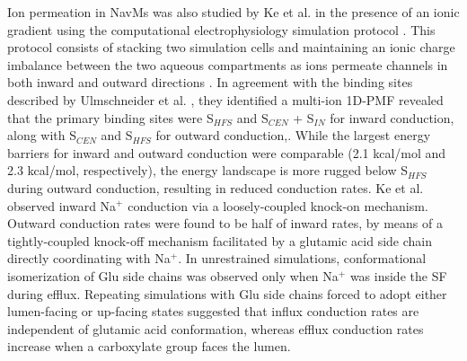 \begin{refsection}
Ion permeation in NavMs was also studied by Ke et al. in the presence of an ionic gradient using the computational electrophysiology simulation protocol \cite{Ke:2014fy}.  This protocol consists of stacking two simulation cells and maintaining an ionic charge imbalance between the two aqueous compartments as ions permeate channels in both inward and outward directions \cite{Kutzner:2011fz}. In agreement with the binding sites described by Ulmschneider et al. \cite{Ulmschneider:2013da}, they identified a multi-ion 1D-PMF revealed that the primary binding sites were S$_{HFS}$ and S$_{CEN}$ + S$_{IN}$ for inward conduction, along with S$_{CEN}$ and S$_{HFS}$ for outward conduction,.  While the largest energy barriers for inward and outward conduction were comparable (2.1 kcal/mol and 2.3 kcal/mol, respectively), the energy landscape is more rugged below S$_{HFS}$ during outward conduction, resulting in reduced conduction rates.  Ke et al. observed inward Na$^{+}$ conduction via a loosely-coupled knock-on mechanism.  Outward conduction rates were found to be half of inward rates, by means of a tightly-coupled knock-off mechanism facilitated by a glutamic acid side chain directly coordinating with Na$^{+}$.  In unrestrained simulations, conformational isomerization of Glu side chains was observed only when Na$^{+}$ was inside the SF during efflux.  Repeating simulations with Glu side chains forced to adopt either lumen-facing or up-facing states suggested that influx conduction rates are independent of glutamic acid conformation, whereas efflux conduction rates increase when a carboxylate group faces the lumen.




\end{refsection}
